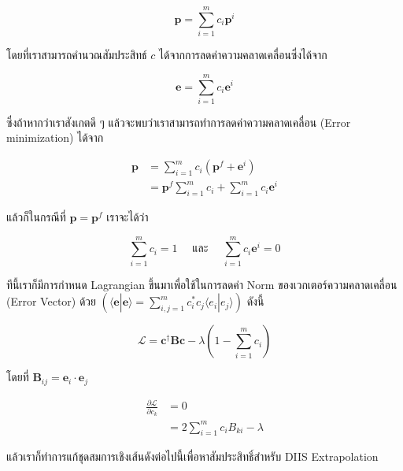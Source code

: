 \begin{equation}
  \mathbf{p}
  =
  \sum_{i=1}^{m} c_i \mathbf{p}^i
\end{equation}

\noindent โดยที่เราสามารถคำนวณสัมประสิทธ์ $c$ ได้จากการลดค่าความคลาดเคลื่อนซึ่งได้จาก

\begin{equation}
  \mathbf{e}
  =
  \sum_{i=1}^{m} c_i \mathbf{e}^i
\end{equation}

\noindent ซึ่งถ้าหากว่าเราสังเกตดี ๆ แล้วจะพบว่าเราสามารถทำการลดค่าความคลาดเคลื่อน (Error minimization) ได้จาก

\begin{align}
  \mathbf{p}
   & =
  \sum_{i=1}^{m} c_i \left( \mathbf{p}^f + \mathbf{e}^i\right) \\
   & =
  \mathbf{p}^f \sum_{i=1}^{m} c_i  + \sum_{i=1}^{m} c_i \mathbf{e}^i
\end{align}

\noindent แล้วก็ในกรณีที่ $\mathbf{p} = \mathbf{p}^f$ เราจะได้ว่า

\begin{equation}
  \sum_{i=1}^{m} c_i = 1
  \quad
  \text{ และ }
  \quad
  \sum_{i=1}^{m} c_i \mathbf{e}^i = 0
\end{equation}

\noindent ทีนี้เราก็มีการกำหนด Lagrangian ขึ้นมาเพื่อใช้ในการลดค่า Norm ของเวกเตอร์ความคลาดเคลื่อน (Error Vector) ด้วย
$(\langle \mathbf{e} | \mathbf{e} \rangle = \sum_{i,j = 1}^{m} c_i^* c_j \langle e_i | e_j \rangle)$ ดังนี้

\begin{equation}
  \mathcal{L}
  =
  \mathbf{c}^\dagger \mathbf{B} \mathbf{c} - \lambda \left( 1-\sum_{i=1}^m c_i \right)
\end{equation}

\noindent โดยที่ $\mathbf{B}_{ij} = \mathbf{e}_i \cdot \mathbf{e}_j$

\begin{align}
  \frac{\partial\mathcal{L}}{\partial c_k}
   & =
  0    \\
   & =
  2 \sum_{i=1}^m c_i B_{ki} -\lambda
\end{align}

\noindent แล้วเราก็ทำการแก้ชุดสมการเชิงเส้นดังต่อไปนี้เพื่อหาสัมประสิทธิ์สำหรับ DIIS Extrapolation

